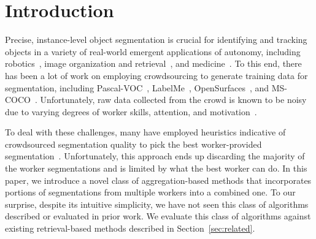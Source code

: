 \vspace{-10pt}
\section{Introduction\label{sec:intro}}
Precise, instance-level object segmentation is crucial for identifying and tracking objects in a variety of real-world emergent applications of autonomy, including robotics~\cite{Natonek1998}, image organization and retrieval~\cite{Yamaguchi2012}, and medicine~\cite{Irshad2014}. To this end, there has been a lot of work on employing crowdsourcing to generate training data for segmentation, including Pascal-VOC~\cite{Everingham15}, LabelMe~\cite{Torralba2010}, OpenSurfaces~\cite{bell15minc}, and MS-COCO~\cite{Lin2012}. Unfortunately, raw data collected from the crowd is known to be noisy due to varying degrees of worker skills, attention, and motivation~\cite{bell14intrinsic,MDWWelinder2010}. 
\par To deal with these challenges, many have employed heuristics indicative of crowdsourced segmentation quality to pick the best worker-provided segmentation~\cite{Sorokin2008,Vittayakorn2011}. Unfortunately, this approach ends up discarding the majority of the worker segmentations and is limited by what the best worker can do. In this paper, we introduce a novel class of aggregation-based methods that incorporates portions of segmentations from multiple workers into a combined one. To our surprise, despite its intuitive simplicity, we have not seen this class of algorithms described or evaluated in prior work. We evaluate this class of algorithms against existing retrieval-based methods described in Section~\ref{sec:related}.  %
